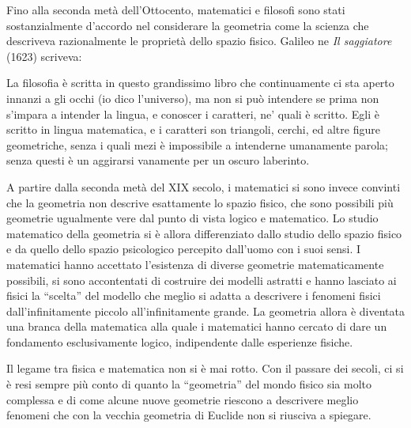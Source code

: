 Fino alla seconda metà dell'Ottocento, matematici e filosofi sono stati sostanzialmente d'accordo nel considerare la geometria come la scienza che descriveva razionalmente le proprietà dello spazio fisico. Galileo ne \emph{Il saggiatore} (1623) scriveva:
\begin{quoting}
La filosofia è scritta in questo grandissimo libro che continuamente ci sta aperto innanzi a gli occhi (io dico l'universo), ma non si può intendere se prima non s'impara a intender la lingua, e conoscer i caratteri, ne' quali è scritto. Egli è scritto in lingua matematica, e i caratteri son triangoli, cerchi, ed altre figure geometriche, senza i quali mezi è impossibile a intenderne umanamente parola; senza questi è un aggirarsi vanamente per un oscuro laberinto.
\end{quoting}
A partire dalla seconda metà del XIX secolo, i matematici si sono invece convinti che la geometria non descrive esattamente lo spazio fisico, che sono possibili più geometrie ugualmente vere dal punto di vista logico e matematico. Lo studio matematico della geometria si è allora differenziato dallo studio dello spazio fisico e da quello dello spazio psicologico percepito dall'uomo con i suoi sensi. I matematici hanno accettato l'esistenza di diverse geometrie matematicamente possibili, si sono accontentati di costruire dei modelli astratti e hanno lasciato ai fisici la ``scelta'' del modello che meglio si adatta a descrivere i fenomeni fisici dall'infinitamente piccolo all'infinitamente grande. La geometria allora è diventata una branca della matematica alla quale i matematici hanno cercato di dare un fondamento esclusivamente logico, indipendente dalle esperienze fisiche. 

Il legame tra fisica e matematica non si è mai rotto. Con il passare dei secoli, ci si è resi sempre più conto di quanto la ``geometria'' del mondo fisico sia molto complessa e di come alcune nuove geometrie riescono a descrivere meglio fenomeni che con la vecchia geometria di Euclide non si riusciva a spiegare.

